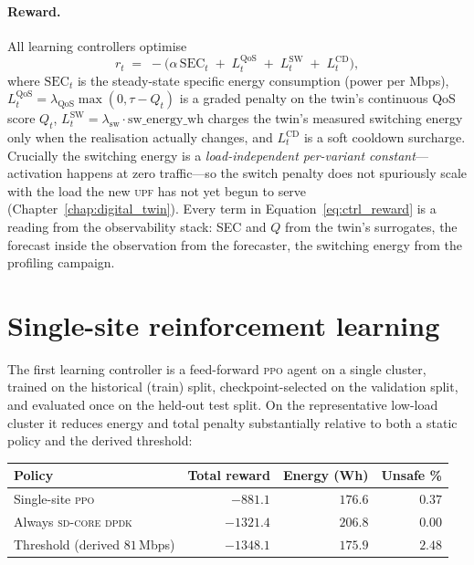 \documentclass[12pt, a4paper]{report}
\newcommand{\dpdk}{\textsc{sd-core dpdk}}
\newcommand{\upf}{\textsc{upf}}
\newcommand{\ppo}{\textsc{ppo}}
\begin{document}
\paragraph{Reward.} All learning controllers optimise
\begin{equation}
  r_t \;=\; -\bigl(\alpha\,\mathrm{SEC}_t \;+\; L^{\mathrm{QoS}}_t \;+\; L^{\mathrm{SW}}_t \;+\; L^{\mathrm{CD}}_t\bigr),
  \label{eq:ctrl_reward}
\end{equation}
where $\mathrm{SEC}_t$ is the steady-state specific energy consumption (power per
Mbps), $L^{\mathrm{QoS}}_t=\lambda_{\mathrm{QoS}}\max(0,\tau-Q_t)$ is a graded
penalty on the twin's continuous QoS score $Q_t$, $L^{\mathrm{SW}}_t=\lambda_{\mathrm{sw}}\cdot
\text{sw\_energy\_wh}$ charges the twin's measured switching energy only when the
realisation actually changes, and $L^{\mathrm{CD}}_t$ is a soft cooldown
surcharge. Crucially the switching energy is a \emph{load-independent per-variant
constant}---activation happens at zero traffic---so the switch penalty does not
spuriously scale with the load the new \upf{} has not yet begun to serve
(Chapter~\ref{chap:digital_twin}). Every term in Equation~\eqref{eq:ctrl_reward}
is a reading from the observability stack: SEC and $Q$ from the twin's
surrogates, the forecast inside the observation from the forecaster, the
switching energy from the profiling campaign.

\section{Single-site reinforcement learning}
\label{sec:ctrl_singlesite}

The first learning controller is a feed-forward \ppo{} agent on a single cluster,
trained on the historical (train) split, checkpoint-selected on the validation
split, and evaluated once on the held-out test split. On the representative
low-load cluster it reduces energy and total penalty substantially relative to
both a static policy and the derived threshold:

\begin{center}
\begin{tabular}{lrrr}
\toprule
Policy & Total reward & Energy (Wh) & Unsafe \% \\
\midrule
Single-site \ppo{} & $\mathbf{-881.1}$ & $\mathbf{176.6}$ & $0.37$ \\
Always \dpdk{} & $-1321.4$ & $206.8$ & $0.00$ \\
Threshold (derived $81$\,Mbps) & $-1348.1$ & $175.9$ & $2.48$ \\
\bottomrule
\end{tabular}
\end{center}
\end{document}
